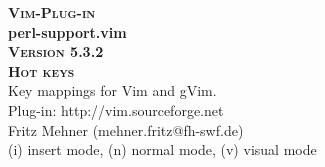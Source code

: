 \documentclass[oneside,10pt,landscape,DIV17]{scrartcl}
\newcommand{\Pluginversion}{5.3.2}
\begin{document}
%

\begin{multicols}{3}
%
\begin{center}
%
\textbf{\textsc{\small{Vim-Plug-in}}}\\
\textbf{\LARGE{perl-support.vim}}\\
\textbf{\textsc{\small{Version \Pluginversion}}}\\
\vspace{5mm}%
\textbf{\textsc{\Huge{Hot keys}}}\\ 
\vspace{5mm}%
Key mappings for Vim and gVim.\\
Plug-in: http://vim.sourceforge.net\\
Fritz Mehner (mehner.fritz@fh-swf.de)\\
\vspace{1.0mm}
{\normalsize (i)} insert mode, {\normalsize (n)} normal mode, {\normalsize (v)} visual mode\\
\vspace{4.0mm}


\end{center}
\end{multicols}
\end{document}
